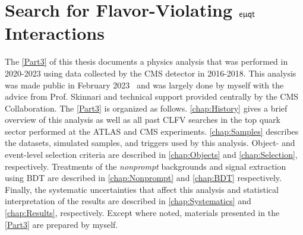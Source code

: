 \part{Search for Flavor-Violating $\textsf{e}\upmu\textsf{{q}t}$ Interactions}
\label{Part3}
The \autoref{Part3} of this thesis documents a physics analysis that was performed in 2020-2023 using data collected by the \ac{CMS} detector in 2016-2018. This analysis was made public in February 2023~\cite{CMS:2023phe} and was largely done by myself with the advice from Prof. Skinnari and technical support provided centrally by the \ac{CMS} Collaboration. The \autoref{Part3} is organized as follows. \autoref{chap:History} gives a brief overview of this analysis as well as all past \ac{CLFV} searches in the top quark sector performed at the \ac{ATLAS} and \ac{CMS} experiments. \autoref{chap:Samples} describes the datasets, simulated samples, and triggers used by this analysis. Object- and event-level selection criteria are described in \autoref{chap:Objects} and \autoref{chap:Selection}, respectively. Treatments of the \emph{nonprompt} backgrounds and signal extraction using \ac{BDT} are described in \autoref{chap:Nonprompt} and \autoref{chap:BDT} respectively. Finally, the systematic uncertainties that affect this analysis and statistical interpretation of the results are described in \autoref{chap:Systematics} and \autoref{chap:Results}, respectively. Except where noted, materials presented in the \autoref{Part3} are prepared by myself.








